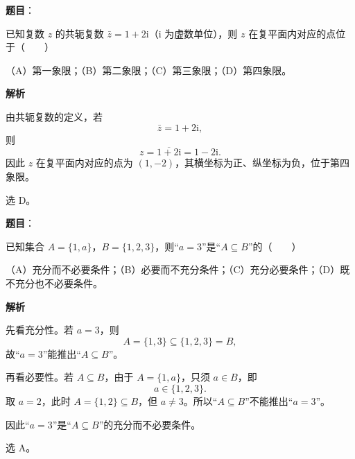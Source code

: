 

\begin{answer}

\textbf{题目}：

已知复数 $z$ 的共轭复数 $\bar z=1+2\mathrm i$（$\mathrm i$ 为虚数单位），则 $z$ 在复平面内对应的点位于\mbox{（　　）}

（A）第一象限；（B）第二象限；（C）第三象限；（D）第四象限。

\textbf{解析}

由共轭复数的定义，若
\nopagebreak[4]
\[\bar z=1+2\mathrm i,\]
则
\nopagebreak[4]
\[z=\overline{1+2\mathrm i}=1-2\mathrm i.\]
因此 $z$ 在复平面内对应的点为 $(1,-2)$，其横坐标为正、纵坐标为负，位于第四象限。

选 D。


\end{answer}
\begin{answer}

\textbf{题目}：

已知集合 $A=\{1,a\}$，$B=\{1,2,3\}$，则“$a=3$”是“$A\subseteq B$”的\mbox{（　　）}

（A）充分而不必要条件；（B）必要而不充分条件；（C）充分必要条件；（D）既不充分也不必要条件。

\textbf{解析}

先看充分性。若 $a=3$，则
\nopagebreak[4]
\[A=\{1,3\}\subseteq\{1,2,3\}=B,\]
故“$a=3$”能推出“$A\subseteq B$”。

再看必要性。若 $A\subseteq B$，由于 $A=\{1,a\}$，只须 $a\in B$，即
\nopagebreak[4]
\[a\in\{1,2,3\}.\]
取 $a=2$，此时 $A=\{1,2\}\subseteq B$，但 $a\neq3$。所以“$A\subseteq B$”不能推出“$a=3$”。

因此“$a=3$”是“$A\subseteq B$”的充分而不必要条件。

选 A。


\end{answer}
